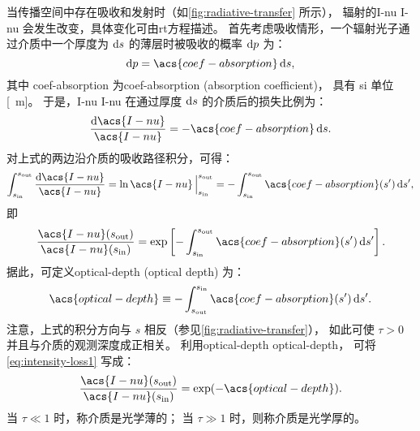 当传播空间中存在吸收和发射时（如\autoref{fig:radiative-transfer} 所示），
辐射的\acl{I-nu} \acs{I-nu} 会发生改变，具体变化可由\acf{rt}方程描述。
首先考虑吸收情形，一个辐射光子通过介质中一个厚度为 $\mathrm{d}s$ 的薄层时被吸收的概率 $\mathrm{d}p$ 为：
\begin{equation}
  \D{p} = \acs{coef-absorption} \,\D{s} ,
\end{equation}
其中 \acs{coef-absorption}
为\acl{coef-absorption} (absorption coefficient)，
具有 \ac{si} 单位 [\si{\per\meter}]。
于是，\acl{I-nu} \acs{I-nu} 在通过厚度 $\mathrm{d}s$ 的介质后的损失比例为：
\begin{equation}
  \label{eq:rt-absorption}
  \frac{\D{\acs{I-nu}}}{\acs{I-nu}} = - \acs{coef-absorption} \,\D{s} .
\end{equation}
对上式的两边沿介质的吸收路径积分，可得：
\begin{equation}
  \int_{s_{\R{in}}}^{s_{\R{out}}} \frac{\D{\acs{I-nu}}}{\acs{I-nu}}
    = \ln\acs{I-nu} \,\Big|_{s_{\R{in}}}^{s_{\R{out}}}
    = - \int_{s_{\R{in}}}^{s_{\R{out}}} \acs{coef-absorption}(s') \,\D{s'} ,
\end{equation}
即
\begin{equation}
  \label{eq:intensity-loss1}
  \frac{\acs{I-nu}(s_{\R{out}})}{\acs{I-nu}(s_{\R{in}})} =
    \exp \left[ - \int_{s_{\R{in}}}^{s_{\R{out}}}
      \acs{coef-absorption}(s') \,\D{s'} \right] .
\end{equation}
据此，可定义\acl{optical-depth} (optical depth) 为：
\begin{equation}
  \label{eq:optical-depth}
  \acs{optical-depth} \equiv
    - \int_{s_{\R{out}}}^{s_{\R{in}}} \acs{coef-absorption}(s') \,\D{s'} .
\end{equation}
注意，上式的积分方向与 $s$ 相反（参见\autoref{fig:radiative-transfer}），
如此可使 $\tau > 0$ 并且与介质的观测深度成正相关。
利用\acl{optical-depth} \acs{optical-depth}，
可将\autoref{eq:intensity-loss1} 写成：
\begin{equation}
  \label{eq:intensity-loss}
  \frac{\acs{I-nu}(s_{\R{out}})}{\acs{I-nu}(s_{\R{in}})} =
    \exp (-\acs{optical-depth}) .
\end{equation}
当 $\tau \ll 1$ 时，称介质是光学薄的；
当 $\tau \gg 1$ 时，则称介质是光学厚的。


